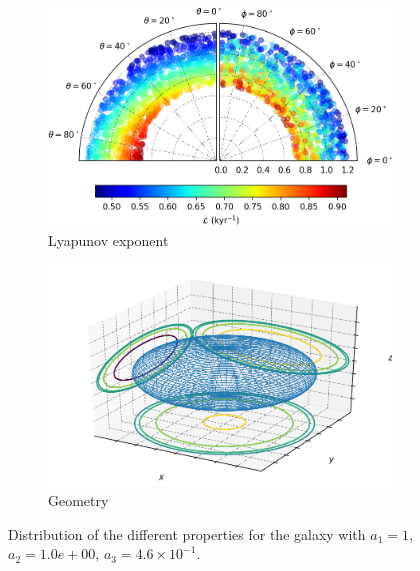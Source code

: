 \begin{figure}[h]
\begin{subfigure}[t]{0.4\textwidth}
        \includegraphics[width=\textwidth]{"../Files/Week 13/images/21_lyapunov"}
        \caption{Lyapunov exponent}
    \end{subfigure}
    \begin{subfigure}[t]{0.4\textwidth}
        \includegraphics[width=\textwidth]{"../Files/Week 13/images/21_ellipsoid"}
        \caption{Geometry}
    \end{subfigure}
    \caption{Distribution of the different properties for the galaxy with $a_1 = 1$, $a_2 = 1.0e+00$, $a_3 = 4.6\times10^{-1}$.}
\end{figure}


